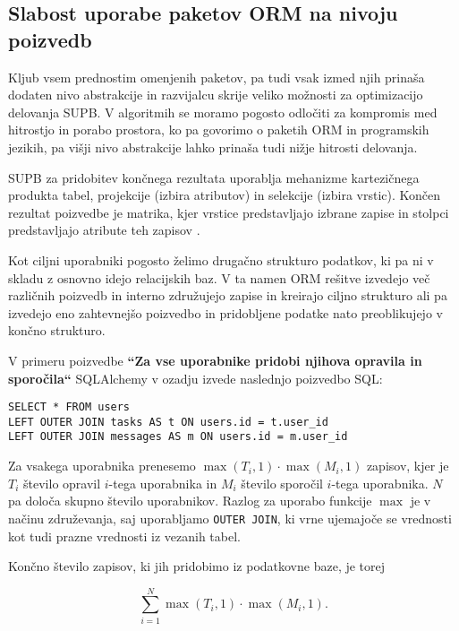 \documentclass[a4paper,12pt,openright]{book}
\begin{document}
    \subsection{Slabost uporabe paketov ORM na nivoju poizvedb}
    Kljub vsem prednostim omenjenih paketov, pa tudi vsak izmed njih prinaša dodaten nivo abstrakcije in razvijalcu skrije veliko možnosti za optimizacijo delovanja SUPB. V algoritmih se moramo pogosto odločiti za kompromis med hitrostjo in porabo prostora, ko pa govorimo o paketih ORM in programskih jezikih, pa višji nivo abstrakcije lahko prinaša tudi nižje hitrosti delovanja.

    SUPB za pridobitev končnega rezultata uporablja mehanizme kartezičnega produkta tabel, projekcije (izbira atributov) in selekcije (izbira vrstic). Končen rezultat poizvedbe je matrika, kjer vrstice predstavljajo izbrane zapise in stolpci predstavljajo atribute teh zapisov \cite{keller1985algorithms}.
    
    Kot ciljni uporabniki pogosto želimo drugačno strukturo podatkov, ki pa ni v skladu z osnovno idejo relacijskih baz. V ta namen ORM rešitve izvedejo več različnih poizvedb in interno združujejo zapise in kreirajo ciljno strukturo ali pa izvedejo eno zahtevnejšo poizvedbo in pridobljene podatke nato preoblikujejo v končno strukturo.
    
    V primeru poizvedbe \textbf{``Za vse uporabnike pridobi njihova opravila in sporočila``} SQLAlchemy v ozadju izvede naslednjo poizvedbo SQL:
    \begin{verbatim}
SELECT * FROM users
LEFT OUTER JOIN tasks AS t ON users.id = t.user_id
LEFT OUTER JOIN messages AS m ON users.id = m.user_id
    \end{verbatim}

    \noindent
    Za vsakega uporabnika prenesemo $\max(T_i, 1) \cdot \max(M_i, 1)$ zapisov, kjer je $T_i$ število opravil $i$-tega uporabnika in $M_i$ število sporočil $i$-tega uporabnika. $N$ pa določa skupno število uporabnikov. Razlog za uporabo funkcije $\max$ je v načinu združevanja, saj uporabljamo {\tt OUTER JOIN}, ki vrne ujemajoče se vrednosti kot tudi prazne vrednosti iz vezanih tabel. 

    Končno število zapisov, ki jih pridobimo iz podatkovne baze, je torej
    
    \begin{equation}
        \sum_{i=1}^{N} \max(T_i, 1) \cdot \max(M_i, 1).
    \label{data_sum_first}
    \end{equation}
\end{document}
